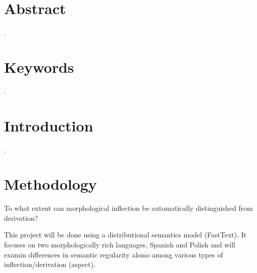 \documentclass[12pt, a4paper]{article}
\begin{document}
\section*{Abstract} %
.

\section*{Keywords} %
.

\newpage
\tableofcontents
\newpage


\section{Introduction}
.

\section{Methodology}
To what extent can morphological inflection be automatically distinguished from derivation? 

This project will be done using a distributional semantics model (FastText). It focuses on two morphologically rich languages, Spanish and Polish and will examin differences in semantic regularity alsmo among various types of inflection/derivation (aspect).

\end{document}
